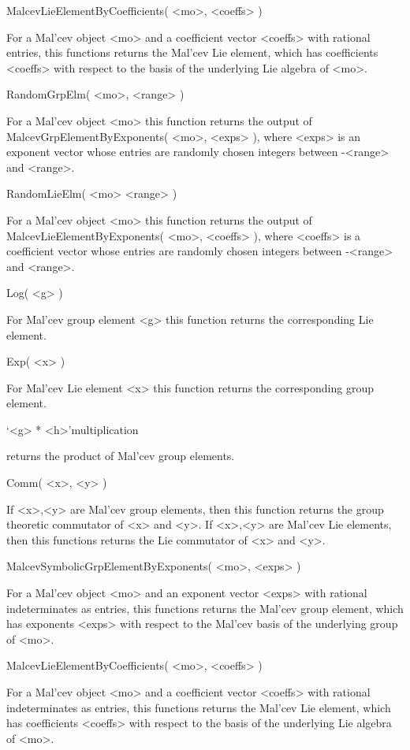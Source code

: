 \> MalcevLieElementByCoefficients( <mo>, <coeffs> )

For a Mal'cev object <mo> and a coefficient vector <coeffs> with rational 
entries, this functions returns the Mal'cev Lie element, which 
has coefficients  <coeffs> with respect to the basis of the underlying
Lie algebra of <mo>.

\> RandomGrpElm( <mo>, <range> )

For a Mal'cev object <mo> this function returns the output of 
MalcevGrpElementByExponents( <mo>, <exps> ), where <exps> is an
exponent vector whose entries are randomly chosen integers between 
-<range> and <range>.

\> RandomLieElm( <mo> <range> )

For a Mal'cev object <mo> this function returns the output of 
MalcevLieElementByExponents( <mo>, <coeffs> ), where <coeffs> is 
a coefficient vector whose entries are randomly chosen integers between 
-<range> and <range>.

\> Log( <g> )

For Mal'cev group element <g> this function returns the corresponding
Lie element.

\> Exp( <x> )

For Mal'cev Lie element <x> this function returns the corresponding
group element.

\> `<g> * <h>'{multiplication} 

returns the product of Mal'cev group elements.

\> Comm( <x>, <y> )

If <x>,<y> are Mal'cev group elements, then this function returns
the group theoretic commutator of <x> and <y>.
If <x>,<y> are Mal'cev Lie elements, then this functions returns
the Lie commutator of <x> and <y>.

\> MalcevSymbolicGrpElementByExponents( <mo>, <exps> )

For a Mal'cev object <mo> and an exponent vector <exps> with rational 
indeterminates as entries, 
this functions returns the Mal'cev group element, which 
has exponents <exps> with respect to the Mal'cev basis of the underlying
group of <mo>.

\> MalcevLieElementByCoefficients( <mo>, <coeffs> )

For a Mal'cev object <mo> and a coefficient vector <coeffs> with rational 
indeterminates as entries, 
this functions returns the Mal'cev Lie element, which 
has coefficients  <coeffs> with respect to the basis of the underlying
Lie algebra of <mo>.

